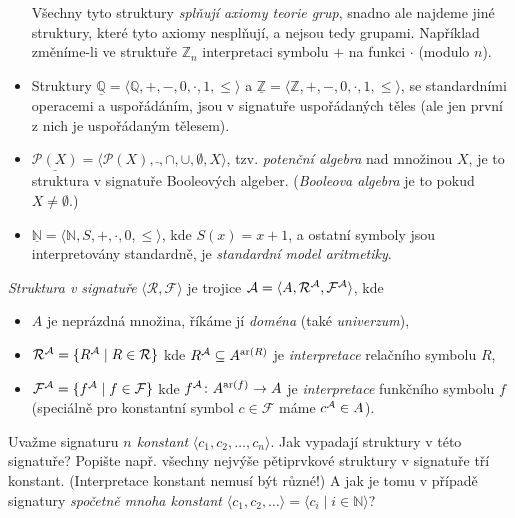 \begin{example}
\begin{itemize}
\begin{itemize}
    \end{itemize}
    Všechny tyto struktury \emph{splňují axiomy teorie grup}, snadno ale najdeme jiné struktury, které tyto axiomy nesplňují, a nejsou tedy grupami. Například změníme-li ve struktuře $\mathbb Z_n$ interpretaci symbolu $+$ na funkci $\cdot$ (modulo $n$).
    \item Struktury $\underline{\mathbb Q}=\langle \mathbb Q, +, -, 0,\cdot,1,\leq\rangle$ a $\underline{\mathbb Z}=\langle \mathbb Z, +, -, 0,\cdot,1,\leq\rangle$, se standardními operacemi a uspořádáním, jsou v signatuře uspořádaných těles (ale jen první z nich je uspořádaným tělesem).
    \item $\underline{\mathcal P(X)}=\langle \mathcal P(X),\bar{},\cap,\cup,\emptyset,X\rangle$, tzv. \emph{potenční algebra} nad množinou $X$, je to struktura v signatuře Booleových algeber. (\emph{Booleova algebra} je to pokud $X\neq\emptyset$.)
    \item $\underline{\mathbb N}=\langle \mathbb N,S,+,\cdot,0,\leq\rangle$, kde $S(x)=x+1$, a ostatní symboly jsou interpretovány standardně, je \emph{standardní model aritmetiky}.
\end{itemize}
\end{example}



\begin{definition}[Struktura]
\emph{Struktura v signatuře} $\langle\mathcal R,\mathcal F\rangle$ je trojice $\mathcal{A}=\langle A, \mathcal R^{\mathcal{A}},\mathcal F^{\mathcal{A}} \rangle$, kde
\begin{itemize}
   \item  $A$ je neprázdná množina, říkáme jí \emph{doména} (také \emph{univerzum}),
   \item $\mathcal R^{\mathcal{A}}=\{R^{\mathcal{A}}\mid R\in\mathcal R\}$ kde $R^{\mathcal{A}}\subseteq A^{\mathrm{ar}(R)}$ je \emph{interpretace} relačního symbolu $R$,
   \item $\mathcal F^{\mathcal{A}}=\{f^{\mathcal{A}}\mid f\in\mathcal F\}$ kde $f^{\mathcal{A}}\colon A^{\mathrm{ar}(f)}\to A$ je \emph{interpretace} funkčního symbolu $f$ (speciálně pro konstantní symbol $c\in\mathcal F$ máme $c^{\mathcal{A}}\in A$).
\end{itemize}


\end{definition}


\begin{exercise}
Uvažme signaturu \emph{$n$ konstant} $\langle c_1,c_2,\dots,c_n\rangle$. Jak vypadají struktury v této signatuře? Popište např. všechny nejvýše pětiprvkové struktury v signatuře tří konstant. (Interpretace konstant nemusí být různé!)
A jak je tomu v případě signatury \emph{spočetně mnoha konstant} $\langle c_1,c_2,\dots\rangle=\langle c_i\mid i\in\mathbb N\rangle$?
\end{exercise}


